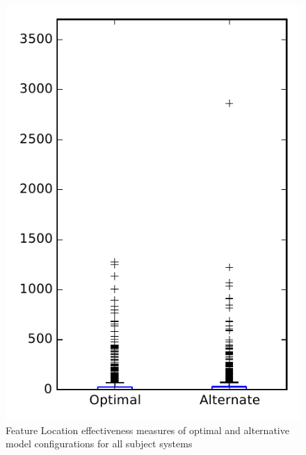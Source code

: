 
\begin{figure}
\centering
\includegraphics[height=0.4\textheight]{figures/combo/flt_rq1_overview}
\caption{Feature Location effectiveness measures of optimal and alternative model configurations for all subject systems}
\label{fig:combo:flt:rq1:overview}
\end{figure}
